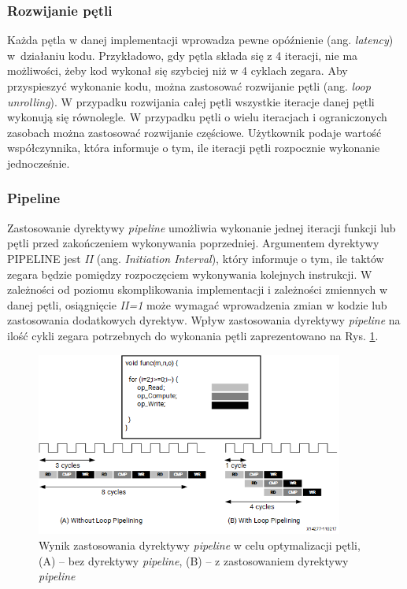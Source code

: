 \subsubsection{Rozwijanie pętli}

Każda pętla w danej implementacji wprowadza pewne opóźnienie (ang. \emph{latency}) w~działaniu kodu. Przykładowo, gdy pętla składa się z 4 iteracji, nie ma możliwości, żeby kod wykonał się szybciej niż w 4 cyklach zegara. Aby przyspieszyć wykonanie kodu, można zastosować rozwijanie pętli (ang. \emph{loop unrolling}). W przypadku rozwijania całej pętli wszystkie iteracje danej pętli wykonują się równolegle. W przypadku pętli o wielu iteracjach i ograniczonych zasobach można zastosować rozwijanie częściowe. Użytkownik podaje wartość współczynnika, która informuje o tym, ile iteracji pętli rozpocznie wykonanie jednocześnie.

\subsubsection{Pipeline}
Zastosowanie dyrektywy \emph{pipeline} umożliwia wykonanie jednej iteracji funkcji lub pętli przed zakończeniem wykonywania poprzedniej. Argumentem dyrektywy PIPELINE jest \emph{II} (ang. \emph{Initiation Interval}), który informuje o tym, ile taktów zegara będzie pomiędzy rozpoczęciem wykonywania kolejnych instrukcji. W zależności od poziomu skomplikowania implementacji i zależności zmiennych w danej pętli, osiągnięcie \emph{II=1} może wymagać wprowadzenia zmian w kodzie lub zastosowania dodatkowych dyrektyw. Wpływ zastosowania dyrektywy \emph{pipeline} na ilość cykli zegara potrzebnych do wykonania pętli zaprezentowano na Rys. \ref{pipeline}.

\begin{figure}[!h]
  \centering
  \includegraphics[width=0.9\textwidth]{img/pipeline.png}
  \caption{Wynik zastosowania dyrektywy \emph{pipeline} w celu optymalizacji pętli, (A) -- bez dyrektywy \emph{pipeline},  (B) -- z zastosowaniem dyrektywy \emph{pipeline} \cite{pipeline}}
  \label{pipeline}
\end{figure}

